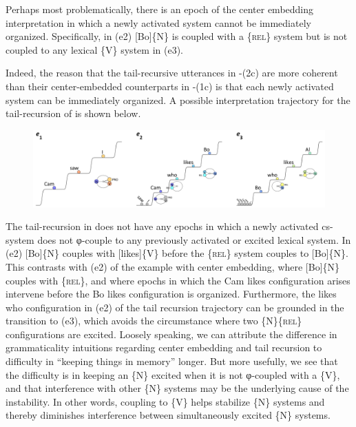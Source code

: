   Perhaps most problematically, there is an epoch of the center embedding interpretation in which a newly activated system cannot be immediately organized. Specifically, in (e2) [Bo]\{N\} is coupled with a \{\textsc{rel}\} system but is not coupled to any lexical \{V\} system in (e3). 

  Indeed, the reason that the tail-recursive utterances in -(2c) are more coherent than their center-embedded counterparts in -(1c) is that each newly activated system can be immediately organized. A possible interpretation trajectory for the tail-recursion of  is shown below. 

  
\begin{figure}
\includegraphics[width=\textwidth]{figures/Tilsen-img133.png}
\caption{\missingcaption}
\label{fig:}
\end{figure}
 

  The tail-recursion in  does not have any epochs in which a newly activated cs-system does not φ-couple to any previously activated or excited lexical system. In (e2) [Bo]\{N\} couples with [likes]\{V\} before the \{\textsc{rel}\} system couples to [Bo]\{N\}. This contrasts with (e2) of the example  with center embedding, where [Bo]\{N\} couples with \{\textsc{rel}\}, and where epochs in which the {\textbar}Cam likes{\textbar} configuration arises intervene before the {\textbar}Bo likes{\textbar} configuration is organized. Furthermore, the {\textbar}likes who{\textbar} configuration in (e2) of the tail recursion trajectory can be grounded in the transition to (e3), which avoids the circumstance where two \{N\}\{\textsc{rel}\} configurations are excited. Loosely speaking, we can attribute the difference in grammaticality intuitions regarding center embedding and tail recursion to difficulty in “keeping things in memory” longer. But more usefully, we see that the difficulty is in keeping an \{N\} excited when it is not φ-coupled with a \{V\}, and that interference with other \{N\} systems may be the underlying cause of the instability. In other words, coupling to \{V\} helps stabilize \{N\} systems and thereby diminishes interference between simultaneously excited \{N\} systems.

